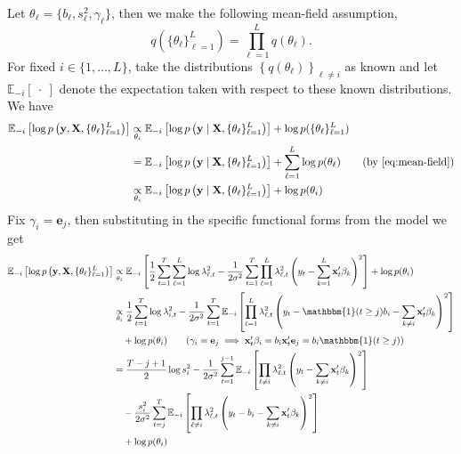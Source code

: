 \documentclass{article}
\newcommand{\E}{\mathbb{E}}
\begin{document}
Let $\theta_\ell = \{b_\ell,s_\ell^2,\gamma_\ell\}$, then we make the following mean-field assumption,
\begin{equation}\label{eq:mean-field}
    q\left(\{\theta_\ell\}_{\ell=1}^L\right) = \prod_{\ell=1}^Lq(\theta_\ell).
\end{equation}
For fixed $i \in \{1, \ldots, L\}$, take the distributions $\left\{q\left(\theta_\ell\right)\right\}_{\ell\neq i}$ as known and let $\E_{-i}[\:\cdot\:]$ denote the expectation taken with respect to these known distributions. We have
\begin{align*}
    \E_{-i}\left[\log p\left(\mathbf{y}, \mathbf{X}, \{\theta_\ell\}_{\ell=1}^L\right)\right] &\underset{\theta_i}{\propto} \E_{-i}\left[\log p\left(\mathbf{y}\;|\; \mathbf{X}, \{\theta_\ell\}_{\ell=1}^L\right)\right] + \log p(\{\theta_\ell\}_{\ell=1}^L) \\
    &= \E_{-i}\left[\log p\left(\mathbf{y}\;|\; \mathbf{X}, \{\theta_\ell\}_{\ell=1}^L\right)\right] + \sum_{\ell=1}^L \log p(\theta_\ell) \tag{by \ref{eq:mean-field}} \\
    &\underset{\theta_i}{\propto} \E_{-i}\left[\log p\left(\mathbf{y}\;|\; \mathbf{X}, \{\theta_\ell\}_{\ell=1}^L\right)\right] + \log p(\theta_i) 
\end{align*}
Fix $\gamma_i = \mathbf{e}_j$, then substituting in the specific functional forms from the model we get
\begin{align*}
   \E_{-i}\left[\log p\left(\mathbf{y}, \mathbf{X}, \{\theta_\ell\}_{\ell=1}^L\right)\right] &\underset{\theta_i}{\propto}  \E_{-i}\left[\frac{1}{2}\sum_{t=1}^T\sum_{\ell=1}^L\log\lambda_{\ell,t}^2 - \frac{1}{2\sigma^2}\sum_{t=1}^T \prod_{\ell=1}^L\lambda_{\ell,t}^2\left(y_t - \sum_{k=1}^L \mathbf{x}'_t\beta_{k}\right)^2\right] + \log p(\theta_i) \\
    &\underset{\theta_i}{\propto} \frac{1}{2} \sum_{t=1}^T \log \lambda^2_{i,t} - \frac{1}{2\sigma^2} \sum_{t=1}^T \E_{-i}\left[\prod_{\ell = 1}^L \lambda_{\ell,t}^2\left(y_t - \mathbbm{1}(t \geq j) b_i - \sum_{k\neq i} \mathbf{x}'_t\beta_k\right)^2\right] \\
    &\quad + \log p(\theta_i) \tag{$\gamma_i = \mathbf{e}_j \implies \mathbf{x}'_t\beta_i = b_i \mathbf{x}'_t\mathbf{e}_j = b_i \mathbbm{1}(t \geq j)$} \\
    &= \frac{T - j + 1}{2} \log s_i^2 - \frac{1}{2\sigma^2} \sum_{t=1}^{j-1} \E_{-i}\left[\prod_{\ell \neq i} \lambda_{\ell,t}^2\left(y_t - \sum_{k\neq i} \mathbf{x}'_t\beta_k\right)^2\right] \\
    &\quad - \frac{s_i^2}{2\sigma^2} \sum_{t=j}^{T} \E_{-i}\left[\prod_{\ell \neq i} \lambda_{\ell,t}^2\left(y_t - b_i - \sum_{k\neq i} \mathbf{x}'_t\beta_k\right)^2\right] \\
    &\quad + \log p(\theta_i) 
\end{align*}
\end{document}
